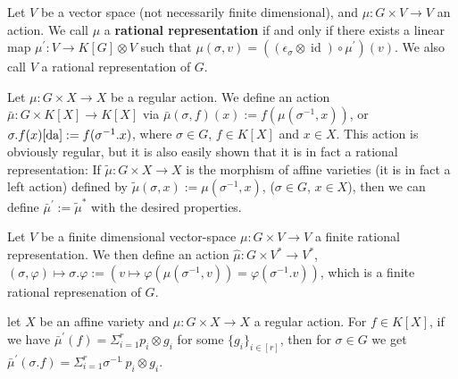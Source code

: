 
\begin{definition}\label{rr}
  Let $V$ be a vector space (not necessarily finite dimensional), and $ \mu : G \times V \longrightarrow V $ an action.
  We call $ \mu $ a \textbf{rational representation} if and only if there exists a linear map $ \mu^\prime \colon V \longrightarrow K[G] \otimes V $ such that $ \mu \left( \sigma , v \right) = \left( \left( \epsilon_\sigma \otimes \operatorname{id} \right) \circ \mu^\prime \right) \left(v\right) $.
  We also call $V$ a rational representation of $G$.
\end{definition}

\begin{definition}\label{funrep}
  Let $\mu \colon G \times X \longrightarrow X$ be a regular action.
  We define an action $\bar{\mu} \colon G \times K[X] \longrightarrow K[X]$ via $\bar{\mu}(\sigma,f)(x) := f(\mu(\sigma^{-1},x))$, or $\sigma.f (x)\ref{da} := f( \sigma^{-1}.x )$, where  $\sigma \in G$, $f \in K[X]$ and $x \in X$.
  This action is obviously regular, but it is also easily shown that it is in fact a rational representation:
  If $\tilde{\mu} \colon G \times X \longrightarrow X$ is the morphism of affine varieties (it is in fact a left action) defined by $ \tilde{\mu} (\sigma,x) := \mu (\sigma^{-1},x)$, ($\sigma \in G$, $x \in X$), then we can define $ \bar{\mu}^\prime := \tilde{\mu}^\ast $ with the desired properties.
\end{definition}

\begin{definition}
  Let $V$ be a finite dimensional vector-space $\mu \colon G \times V \longrightarrow V$ a finite rational representation.
  We then define an action $\hat{\mu} \colon G \times V^\ast \longrightarrow V^\ast$, $ (\sigma,\varphi) \mapsto \sigma.\varphi := (v \mapsto \varphi(\mu(\sigma^{-1},v)) = \varphi(\sigma^{-1}.v))$, which is a finite rational represenation of $G$.
\end{definition}

\begin{proposition}\label{rara}
  let $X$ be an affine variety and $\mu \colon G \times X \longrightarrow X$ a regular action.
  For $f \in K[X]$, if we have $\bar{\mu}^\prime (f) = \Sigma_{i = 1}^r p_i \otimes g_i$ for some $\{g_i\}_{i\in [r]}$, then for $\sigma \in G$ we get $\bar{\mu}^\prime (\sigma.f) = \Sigma_{i = 1}^r \sigma^{-1} \dot{\phantom{.}} p_i \otimes g_i$.
\end{proposition}

